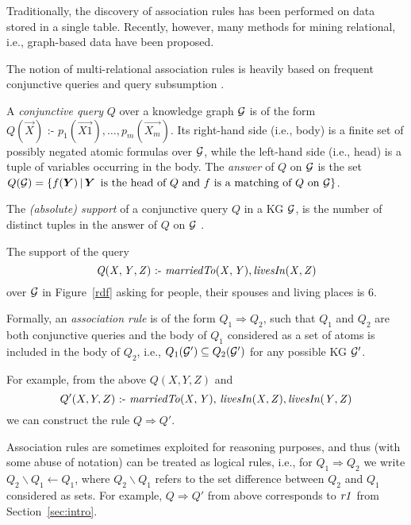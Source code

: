 Traditionally, the discovery of association rules  has been performed on data stored in a single table.
Recently, however, many methods for mining relational, i.e., graph-based data have been
proposed.%

The notion of multi-relational association rules is heavily based on frequent conjunctive queries and query subsumption \cite{warmer}. 

\begin{definition}
A \emph{conjunctive query} $Q$ over a knowledge graph $\mathcal{G}$ is of the form $Q(\vec{X})\text{ :- }p_1(\vec{X1}),\dotsc,p_m(\vec{X_m})$. Its  right-hand side (i.e., body) is a finite set of possibly negated atomic formulas over $\mathcal{G}$, while the left-hand side (i.e., head) is a tuple of variables occurring in the body. The \emph{answer} of $Q$ on $\mathcal{G}$ is the set $Q(\cG)=\{f(\vec{Y})\,|\,\vec{Y}\,\text{  is the head of } Q \text{ and } f \text{ is a matching of } Q \text{ on } \cG\}$.
\end{definition}

The \emph{(absolute) support} of a conjunctive query $Q$ in a KG $\mathcal{G}$, is the number of distinct tuples in the answer of $Q$ on $\mathcal{G}$ \cite{DBLP:conf/ilp/DehaspeR97}. 

\begin{example}
The support of the query
\begin{equation}\mathit{Q(X,Y,Z)\text{ :- }marriedTo(X,Y),\, }\mathit{livesIn(X,Z)}
\end{equation}
over $\mathcal{G}$ in Figure~\ref{rdf} asking for people, their spouses and living places is $6$.
\end{example} 
Formally, an \emph{association rule} is of the form $Q_1\Rightarrow Q_2$, such that $Q_1$ and $Q_2$ are both conjunctive queries and the body of $Q_1$ considered as a set of atoms is included in the body of $Q_2$,  i.e., $Q_1(\mathcal{G}')\subseteq Q_2(\mathcal{G}')$ for any possible KG $\mathcal{G}'$. 

For example, from the above $Q(X,Y,Z)$ and
\begin{equation}Q'(X,Y,Z)\text{ :- }\mathit{marriedTo(X,Y),\,livesIn(X,Z),\,} \mathit{livesIn(Y,Z)}
\end{equation} we can construct the rule $Q \Rightarrow Q'$. 
 

Association rules are sometimes exploited for reasoning purposes, and thus (with some abuse of notation) can be treated as logical rules, i.e., for $Q_1 \Rightarrow Q_2$ we write $Q_2\backslash Q_1 \leftarrow Q_1$, where $Q_2 \backslash Q_1$ refers to the set difference between $Q_2$ and $Q_1$ considered as sets. For example, $Q \Rightarrow Q'$ from above corresponds to $\mathit{r1}$ from Section~\ref{sec:intro}.

